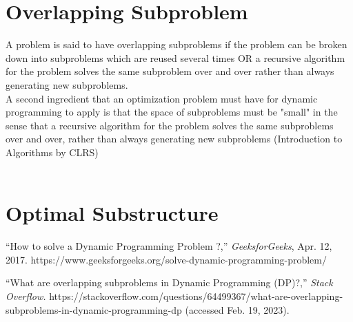 	\section*{Overlapping Subproblem}
	
	A problem is said to have overlapping subproblems\cite{overlapping_subproblem} if the problem can be broken down into subproblems which are reused several times OR a recursive algorithm for the problem solves the same subproblem over and over rather than always generating new subproblems.\\
	
	A second ingredient that an optimization problem must have for dynamic programming to apply is that the space of subproblems must be "small" in the sense that a recursive algorithm for the problem solves the same subproblems over and over, rather than always generating new subproblems (Introduction to Algorithms by CLRS)\\
	
	
	‌
	
	
	
	\section*{Optimal Substructure}
	
	
	
	\begin{thebibliography}{999}		
		
		“How to solve a Dynamic Programming Problem ?,” \emph{GeeksforGeeks}, Apr. 12, 2017. https://www.geeksforgeeks.org/solve-dynamic-programming-problem/
		
		“What are overlapping subproblems in Dynamic Programming (DP)?,”
		\emph{Stack Overflow.} https://stackoverflow.com/questions/64499367/what-are-overlapping-subproblems-in-dynamic-programming-dp (accessed Feb. 19, 2023).
		
		
		
	\end{thebibliography}
	
